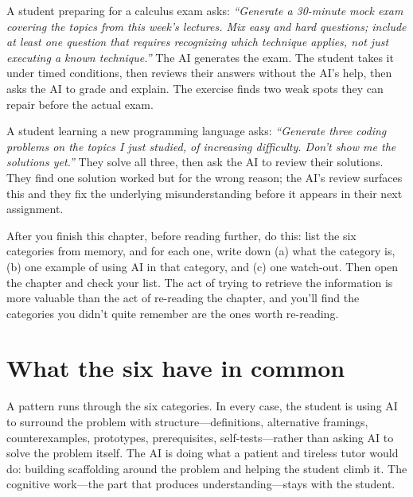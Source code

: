 \documentclass[11pt]{book}
\begin{document}
\begin{example}
A student preparing for a calculus exam asks: \emph{``Generate a 30-minute mock exam covering the topics from this week's lectures. Mix easy and hard questions; include at least one question that requires recognizing which technique applies, not just executing a known technique.''} The AI generates the exam. The student takes it under timed conditions, then reviews their answers without the AI's help, then asks the AI to grade and explain. The exercise finds two weak spots they can repair before the actual exam.
\end{example}

\begin{example}
A student learning a new programming language asks: \emph{``Generate three coding problems on the topics I just studied, of increasing difficulty. Don't show me the solutions yet.''} They solve all three, then ask the AI to review their solutions. They find one solution worked but for the wrong reason; the AI's review surfaces this and they fix the underlying misunderstanding before it appears in their next assignment.
\end{example}

\begin{tryit}
After you finish this chapter, before reading further, do this: list the six categories from memory, and for each one, write down (a) what the category is, (b) one example of using AI in that category, and (c) one watch-out. Then open the chapter and check your list. The act of trying to retrieve the information is more valuable than the act of re-reading the chapter, and you'll find the categories you didn't quite remember are the ones worth re-reading.
\end{tryit}

\section{What the six have in common}

A pattern runs through the six categories. In every case, the student is using AI to surround the problem with structure---definitions, alternative framings, counterexamples, prototypes, prerequisites, self-tests---rather than asking AI to solve the problem itself. The AI is doing what a patient and tireless tutor would do: building scaffolding around the problem and helping the student climb it. The cognitive work---the part that produces understanding---stays with the student.
\end{document}
